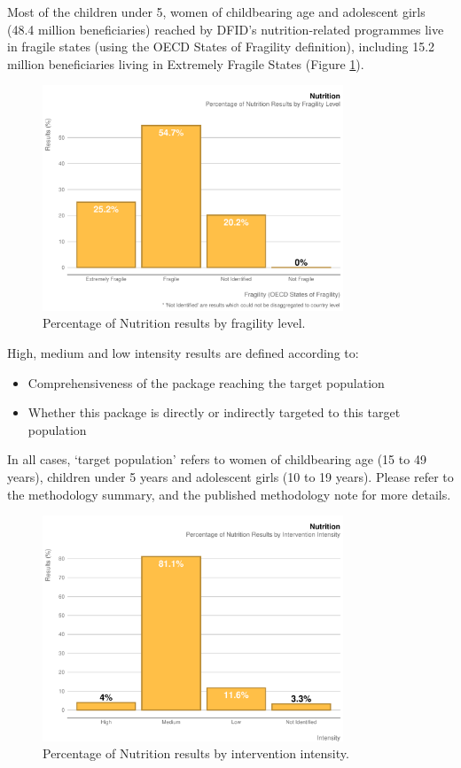 Most of the children under 5, women of childbearing age and adolescent girls (48.4 million beneficiaries) reached by DFID’s nutrition-related programmes live in fragile states (using the OECD States of Fragility definition), including 15.2 million beneficiaries living in Extremely Fragile States (Figure \ref{fig:nutrition_fragility_plot}). %

\begin{figure}[htbp]
	\centering
	\includegraphics[width=0.8\textwidth]{../figs/nutrition_fragility_plot} \hfill
	\caption{Percentage of Nutrition results by fragility level.}\label{fig:nutrition_fragility_plot}
\end{figure}


High, medium and low intensity results are defined according to:
\begin{itemize}
	\item Comprehensiveness of the package reaching the target population
	\item Whether this package is directly or indirectly targeted to this target population
\end{itemize}

In all cases, `target population' refers to women of childbearing age (15 to 49 years), children under 5 years and adolescent girls (10 to 19 years). %
Please refer to the methodology summary, and the published methodology note for more details. %

\begin{figure}[htbp]
	\centering
	\includegraphics[width=0.8\textwidth]{../figs/nutrition_intensity_plot} \hfill
	\caption{Percentage of Nutrition results by intervention intensity.}\label{fig:nutrition_intensity_plot}
\end{figure}

